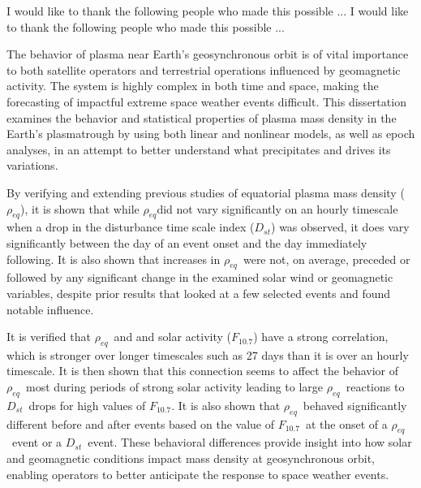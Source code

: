 \documentclass[11 pt]{GMUDissertation}
\newcommand{\req}{\ensuremath{\rho_{eq}}} %
\newcommand{\dst}{\ensuremath{D_{st}}} %
\newcommand{\f}{\ensuremath{F_{10.7}}} %
\begin{document}
\noindent I would like to thank the following people who made this possible ...
I would like to thank the following people who made this possible ...


\tableofcontents

\listoftables

\listoffigures

\abstractpage

The behavior of plasma near Earth's geosynchronous orbit is of vital importance to both satellite operators and terrestrial operations influenced by geomagnetic activity. The system is highly complex in both time and space, making the forecasting of impactful extreme space weather events difficult. This dissertation examines the behavior and statistical properties of plasma mass density in the Earth's plasmatrough by using both linear and nonlinear models, as well as epoch analyses, in an attempt to better understand what precipitates and drives its variations. 

By verifying and extending previous studies of equatorial plasma mass density (\req), it is shown that while \req did not vary significantly on an hourly timescale when a drop in the disturbance time scale index (\dst) was observed, it does vary significantly between the day of an event onset and the day immediately following. It is also shown that increases in \req\ were not, on average, preceded or followed by any significant change in the examined solar wind or geomagnetic variables, despite prior results that looked at a few selected events and found notable influence. 

It is verified that \req\ and and solar activity (\f) have a strong correlation, which is stronger over longer timescales such as 27 days than it is over an hourly timescale. It is then shown that this connection seems to affect the behavior of \req\ most during periods of strong solar activity leading to large \req\ reactions to \dst\ drops for high values of \f.  It is also shown that \req\ behaved significantly different before and after events based on the value of \f\ at the onset of a \req\ event or a \dst\ event. These behavioral differences provide insight into how solar and geomagnetic conditions impact mass density at geosynchronous orbit, enabling operators to better anticipate the response to space weather events.


\end{document}

